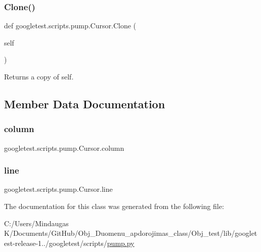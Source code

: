 \subsubsection{\texorpdfstring{Clone()}{Clone()}}
{\footnotesize\ttfamily def googletest.\+scripts.\+pump.\+Cursor.\+Clone (\begin{DoxyParamCaption}\item[{}]{self }\end{DoxyParamCaption})}

\begin{DoxyVerb}Returns a copy of self.\end{DoxyVerb}
 

\subsection{Member Data Documentation}
\mbox{\label{classgoogletest_1_1scripts_1_1pump_1_1_cursor_ab54c274e7622e7a9a88adb63219be144}} 
\subsubsection{\texorpdfstring{column}{column}}
{\footnotesize\ttfamily googletest.\+scripts.\+pump.\+Cursor.\+column}

\mbox{\label{classgoogletest_1_1scripts_1_1pump_1_1_cursor_ac5ea3e3272777d4798d4a3d6a963181b}} 
\subsubsection{\texorpdfstring{line}{line}}
{\footnotesize\ttfamily googletest.\+scripts.\+pump.\+Cursor.\+line}



The documentation for this class was generated from the following file\+:\begin{DoxyCompactItemize}
\item 
C\+:/\+Users/\+Mindaugas K/\+Documents/\+Git\+Hub/\+Obj\+\_\+\+Duomenu\+\_\+apdorojimas\+\_\+class/\+Obj\+\_\+test/lib/googletest-\/release-\/1../googletest/scripts/\mbox{\hyperlink{_obj__test_2lib_2googletest-release-1_88_81_2googletest_2scripts_2pump_8py}{pump.\+py}}\end{DoxyCompactItemize}
